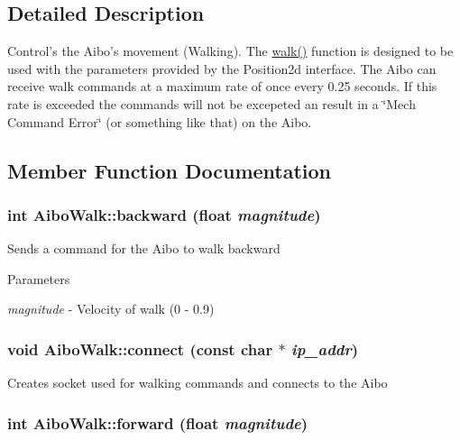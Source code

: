 \subsection{Detailed Description}
Control's the Aibo's movement (Walking). The \hyperlink{classAiboWalk_ace69bca076d0091769b1af5ca7636953}{walk()} function is designed to be used with the parameters provided by the Position2d interface. The Aibo can receive walk commands at a maximum rate of once every 0.25 seconds. If this rate is exceeded the commands will not be excepeted an result in a \char`\"{}Mech Command Error\char`\"{} (or something like that) on the Aibo. 

\subsection{Member Function Documentation}
\hypertarget{classAiboWalk_a38821bc26f7140c31dfe72713a335fef}{
\subsubsection[{backward}]{\setlength{\rightskip}{0pt plus 5cm}int AiboWalk::backward (float {\em magnitude})}}
\label{classAiboWalk_a38821bc26f7140c31dfe72713a335fef}
Sends a command for the Aibo to walk backward 
\begin{DoxyParams}{Parameters}
\item[{\em magnitude}]-\/ Velocity of walk (0 -\/ 0.9) \end{DoxyParams}
\hypertarget{classAiboWalk_a579e96df4e476be1232080d736f1cbf2}{
\subsubsection[{connect}]{\setlength{\rightskip}{0pt plus 5cm}void AiboWalk::connect (const char $\ast$ {\em ip\_\-addr})}}
\label{classAiboWalk_a579e96df4e476be1232080d736f1cbf2}
Creates socket used for walking commands and connects to the Aibo \hypertarget{classAiboWalk_ad0af8173899889a2493657027100f7f8}{
\subsubsection[{forward}]{\setlength{\rightskip}{0pt plus 5cm}int AiboWalk::forward (float {\em magnitude})}}
